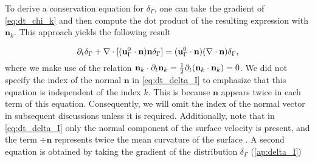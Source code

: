 To derive a conservation equation for $\delta_\Gamma$, one can take the gradient of \ref{eq:dt_chi_k} and then compute the dot product of the resulting expression with $\textbf{n}_k$. This approach yields the following result \citep{marle1982macroscopic,drew1990,lhuillier2000bilan,junqua2003}

\begin{equation}
    \partial_t \delta_\Gamma
    + \mathbf{\nabla}\cdot [(\textbf{u}_\Gamma^0\cdot \textbf{n}) \textbf{n}\delta_\Gamma ]
    = (\textbf{u}_\Gamma^0 \cdot \textbf{n})(\mathbf{\nabla}\cdot\textbf{n}) \delta_\Gamma ,
    \label{eq:dt_delta_I}
\end{equation} 
where we make use of the relation $\textbf{n}_k\cdot \partial_t\textbf{n}_k= \frac{1}{2}\partial_t(\textbf{n}_k\cdot \textbf{n}_k) = 0$. We did not specify the index of the normal $\textbf{n}$ in \ref{eq:dt_delta_I} to emphasize that this equation is independent of the index $k$. This is because $\textbf{n}$ appears twice in each term of this equation. Consequently, we will omit the index of the normal vector in subsequent discussions unless it is required. %
Additionally, note that in \ref{eq:dt_delta_I} only the normal component of the surface velocity is present, and the term $\div \textbf{n}$ represents twice the mean curvature of the surface \citep{aris2012vectors}.  %
A second equation is obtained by taking the gradient of the distribution $\delta_\Gamma $ (\ref{ap:delta_I}) 




